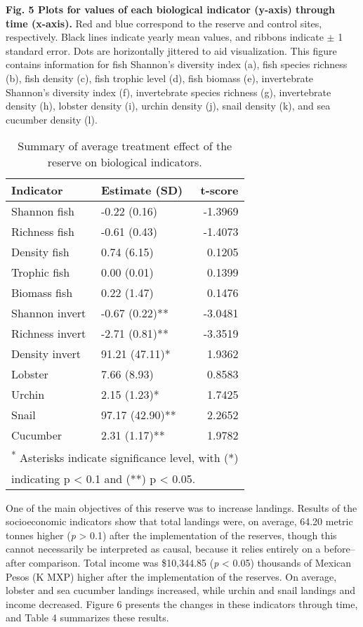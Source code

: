 \documentclass[12pt,]{article}
\begin{document}
\clearpage

\textbf{Fig. 5 Plots for values of each biological indicator (y-axis)
through time (x-axis).} Red and blue correspond to the reserve and
control sites, respectively. Black lines indicate yearly mean values,
and ribbons indicate \(\pm\) 1 standard error. Dots are horizontally
jittered to aid visualization. This figure contains information for fish
Shannon's diversity index (a), fish species richness (b), fish density
(c), fish trophic level (d), fish biomass (e), invertebrate Shannon's
diversity index (f), invertebrate species richness (g), invertebrate
density (h), lobster density (i), urchin density (j), snail density (k),
and sea cucumber density (l).

\begin{table}

\caption{\label{tab:table of bio results}Summary of average treatment effect of the reserve on biological indicators.}
\centering
\begin{tabular}[t]{l|l|r}
\hline
Indicator & Estimate (SD) & t-score\\
\hline
Shannon fish & -0.22 (0.16) & -1.3969\\
\hline
Richness fish & -0.61 (0.43) & -1.4073\\
\hline
Density fish & 0.74 (6.15) & 0.1205\\
\hline
Trophic fish & 0.00 (0.01) & 0.1399\\
\hline
Biomass fish & 0.22 (1.47) & 0.1476\\
\hline
Shannon invert & -0.67 (0.22)** & -3.0481\\
\hline
Richness invert & -2.71 (0.81)** & -3.3519\\
\hline
Density invert & 91.21 (47.11)* & 1.9362\\
\hline
Lobster & 7.66 (8.93) & 0.8583\\
\hline
Urchin & 2.15 (1.23)* & 1.7425\\
\hline
Snail & 97.17 (42.90)** & 2.2652\\
\hline
Cucumber & 2.31 (1.17)** & 1.9782\\
\hline
\multicolumn{3}{l}{\textsuperscript{*} Asterisks indicate significance level, with (*)}\\
\multicolumn{3}{l}{indicating p < 0.1 and (**) p < 0.05.}\\
\end{tabular}
\end{table}

One of the main objectives of this reserve was to increase landings.
Results of the socioeconomic indicators show that total landings were,
on average, 64.20 metric tonnes higher (\emph{p} \textgreater{} 0.1)
after the implementation of the reserves, though this cannot necessarily
be interpreted as causal, because it relies entirely on a before--after
comparison. Total income was \$10,344.85 (\emph{p} \textless{} 0.05)
thousands of Mexican Pesos (K MXP) higher after the implementation of
the reserves. On average, lobster and sea cucumber landings increased,
while urchin and snail landings and income decreased. Figure 6 presents
the changes in these indicators through time, and Table 4 summarizes
these results.
\end{document}
